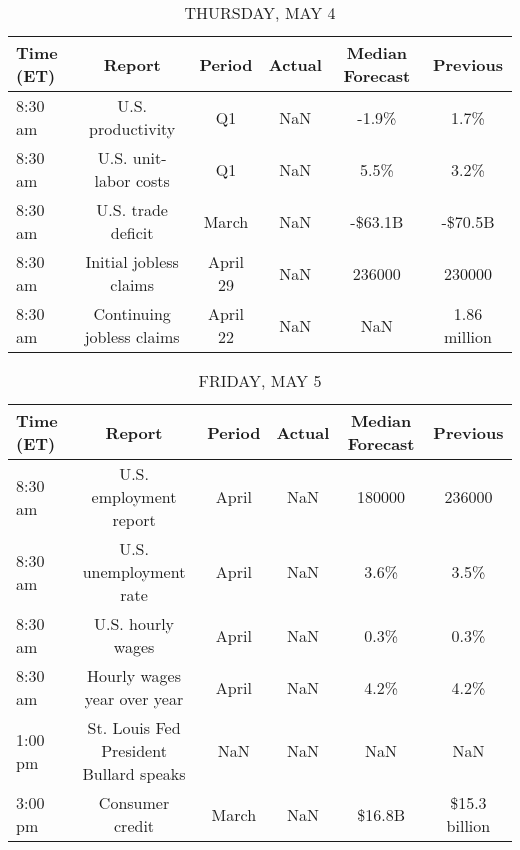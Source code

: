 \documentclass{article}%
\begin{document}
%


\begin{table}[htbp]%
\caption{THURSDAY, MAY 4}%
\centering%
\begin{adjustbox}{width=1\textwidth}%
\begin{tabular}{lccccc}
\toprule
Time (ET) &                    Report &   Period & Actual & Median Forecast &     Previous \\
\midrule
  8:30 am &         U.S. productivity &       Q1 &    NaN &           -1.9\% &         1.7\% \\
  8:30 am &     U.S. unit-labor costs &       Q1 &    NaN &            5.5\% &         3.2\% \\
  8:30 am &        U.S. trade deficit &    March &    NaN &         -\$63.1B &      -\$70.5B \\
  8:30 am &    Initial jobless claims & April 29 &    NaN &          236000 &       230000 \\
  8:30 am & Continuing jobless claims & April 22 &    NaN &             NaN & 1.86 million \\
\bottomrule
\end{tabular}
%
\end{adjustbox}%
\end{table}

%


\begin{table}[htbp]%
\caption{FRIDAY, MAY 5}%
\centering%
\begin{adjustbox}{width=1\textwidth}%
\begin{tabular}{lccccc}
\toprule
Time (ET) &                                 Report & Period & Actual & Median Forecast &      Previous \\
\midrule
  8:30 am &                 U.S. employment report &  April &    NaN &          180000 &        236000 \\
  8:30 am &                 U.S. unemployment rate &  April &    NaN &            3.6\% &          3.5\% \\
  8:30 am &                      U.S. hourly wages &  April &    NaN &            0.3\% &          0.3\% \\
  8:30 am &            Hourly wages year over year &  April &    NaN &            4.2\% &          4.2\% \\
  1:00 pm & St. Louis Fed President Bullard speaks &    NaN &    NaN &             NaN &           NaN \\
  3:00 pm &                        Consumer credit &  March &    NaN &          \$16.8B & \$15.3 billion \\
\bottomrule
\end{tabular}
%
\end{adjustbox}%
\end{table}
\end{document}
